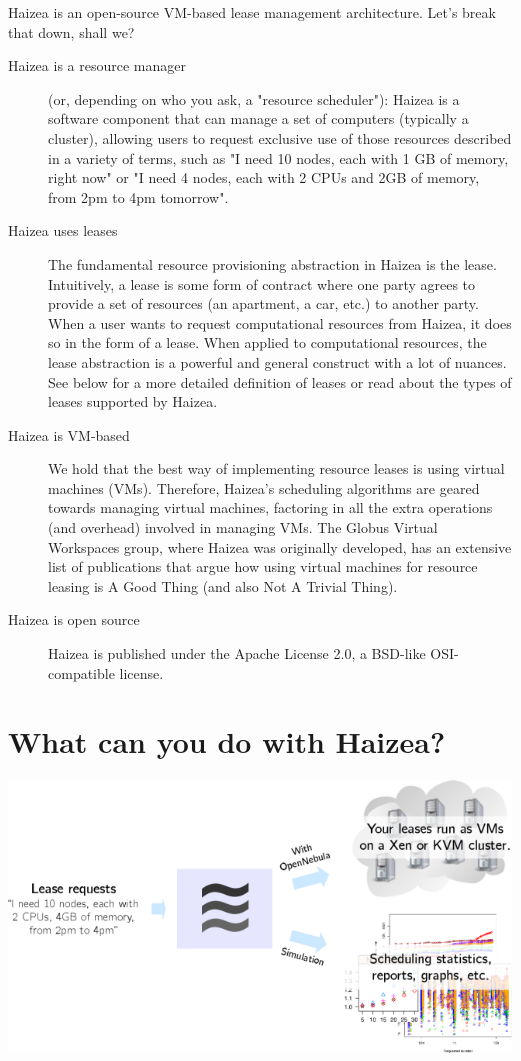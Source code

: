 Haizea is an open-source VM-based lease management architecture. Let's break that down, shall we?

\begin{description}
\item[Haizea is a resource manager] (or, depending on who you ask, a "resource scheduler"): Haizea is a software component that can manage a set of computers (typically a cluster), allowing users to request exclusive use of those resources described in a variety of terms, such as "I need 10 nodes, each with 1 GB of memory, right now" or "I need 4 nodes, each with 2 CPUs and 2GB of memory, from 2pm to 4pm tomorrow".
\item[Haizea uses leases] The fundamental resource provisioning abstraction in Haizea is the lease. Intuitively, a lease is some form of contract where one party agrees to provide a set of resources (an apartment, a car, etc.) to another party. When a user wants to request computational resources from Haizea, it does so in the form of a lease. When applied to computational resources, the lease abstraction is a powerful and general construct with a lot of nuances. See below for a more detailed definition of leases or read about the types of leases supported by Haizea.
\item[Haizea is VM-based] We hold that the best way of implementing resource leases is using virtual machines (VMs). Therefore, Haizea's scheduling algorithms are geared towards managing virtual machines, factoring in all the extra operations (and overhead) involved in managing VMs. The Globus Virtual Workspaces group, where Haizea was originally developed, has an extensive list of publications that argue how using virtual machines for resource leasing is A Good Thing (and also Not A Trivial Thing).
\item[Haizea is open source] Haizea is published under the Apache License 2.0, a BSD-like OSI-compatible license.
\end{description}

\section{What can you do with Haizea?}

\begin{center}
\includegraphics{images/what_haizea_does.png}
\end{center}


